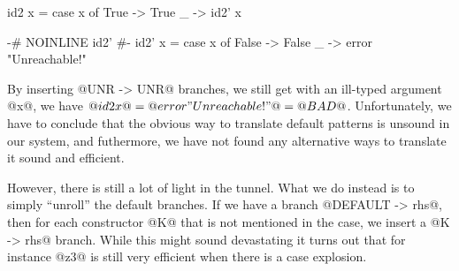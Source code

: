 \begin{code}
    id2 x = case x of
        True -> True
        _    -> id2' x

    {-# NOINLINE id2' #-}
    id2' x = case x of
        False -> False
        _     -> error "Unreachable!"
\end{code}

By inserting @UNR -> UNR@ branches, we still get with an ill-typed
argument @x@, we have $@id2 x@ = @error "Unreachable!"@ = @BAD@$.
Unfortunately, we have to conclude that the obvious way to translate
default patterns is unsound in our system, and futhermore, we have not
found any alternative ways to translate it sound and efficient.

However, there is still a lot of light in the tunnel. What we do
instead is to simply ``unroll'' the default branches.  If we have a
branch @DEFAULT -> rhs@, then for each constructor @K@ that is not
mentioned in the case, we insert a @K -> rhs@ branch. While this might
sound devastating it turns out that for instance @z3@ is still very
efficient when there is a case explosion.
